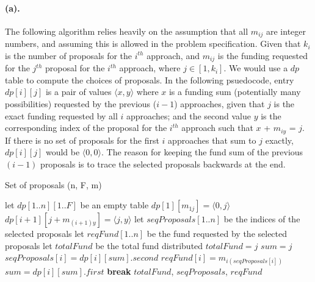 \documentclass[12pt]{article}
\begin{document}
\paragraph{(a).} The following algorithm relies heavily on the assumption that all \(m_{ij}\) are integer numbers, and assuming this is allowed in the problem specification. Given that \(k_i\) is the number of proposals for the \(i^{th}\) approach, and \(m_{ij}\) is the funding requested for the \(j^{th}\) proposal for the \(i^{th}\) approach, where \(j \in [1, k_i]\). We would use a \(dp\) table to compute the choices of proposals. In the following psuedocode, entry \(dp[i][j]\) is a pair of values \(\langle x,y\rangle\) where \(x\) is a funding sum (potentially many possibilities) requested by the previous (\(i-1\)) approaches, given that \(j\) is the exact funding requested by all \(i\) approaches; and the second value \(y\) is the corresponding index of the proposal for the \(i^{th}\) approach such that \(x\) + \(m_{iy}\) = \(j\). If there is no set of proposals for the first \(i\) approaches that sum to \(j\) exactly, \(dp[i][j]\) would be \(\langle 0,0\rangle\). The reason for keeping the fund sum of the previous \((i-1)\) proposals is to trace the selected proposals backwards at the end.
\begin{algorithm}[H]
     \caption{Set of proposals (n, F, m)}
     \begin{algorithmic}[1]
          \State let \(dp[1..n][1..F]\) be an empty table 
               \State \(dp[1][m_{1j}] = \langle 0,j \rangle\) 
          \EndFor
                                   \State \(dp[i+1][j+m_{(i+1)y}] = \langle j,y \rangle\)
                              \EndIf
                         \EndFor
                    \EndIf
               \EndFor
          \EndFor
          \State let \(seqProposals[1..n]\) be the indices of the selected proposals
          \State let \(reqFund[1..n]\) be the fund requested by the selected proposals
          \State let \(totalFund\) be the total fund distributed
                
                    \State \(totalFund = j\)
                    \State \(sum = j\)
                     
                         \State \(seqProposals[i] = dp[i][sum].second\)
                         \State \(reqFund[i] = m_{i(seqProposals[i])}\)
                         \State \(sum = dp[i][sum].first\)
                    \EndFor
                    \State \textbf{break}
               \EndIf
          \EndFor
          \State \Return \(totalFund\), \(seqProposals\), \(reqFund\)
     \end{algorithmic}
\end{algorithm}
\end{document}
